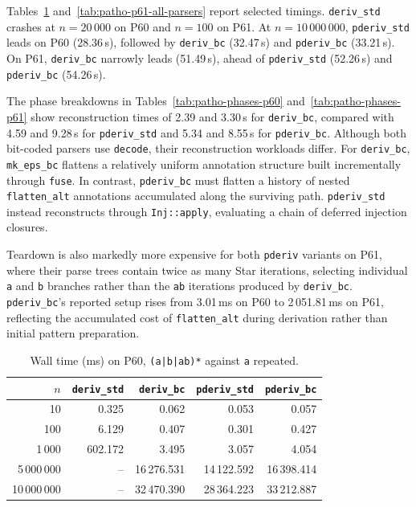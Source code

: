 %
%
%


Tables~\ref{tab:patho-p60-all-parsers}
and~\ref{tab:patho-p61-all-parsers}
report selected timings.
\texttt{deriv\_std} crashes at $n=20\,000$
on P60 and $n=100$ on P61.
At $n=10\,000\,000$, \texttt{pderiv\_std}
leads on P60 (28.36\,s), followed by
\texttt{deriv\_bc} (32.47\,s) and
\texttt{pderiv\_bc} (33.21\,s).
On P61, \texttt{deriv\_bc} narrowly leads
(51.49\,s), ahead of \texttt{pderiv\_std}
(52.26\,s) and \texttt{pderiv\_bc} (54.26\,s).

The phase breakdowns in
Tables~\ref{tab:patho-phases-p60}
and~\ref{tab:patho-phases-p61}
show reconstruction times of 2.39 and 3.30\,s
for \texttt{deriv\_bc}, compared with
4.59 and 9.28\,s for \texttt{pderiv\_std}
and 5.34 and 8.55\,s for \texttt{pderiv\_bc}.
Although both bit-coded parsers use \texttt{decode},
their reconstruction workloads differ.
For \texttt{deriv\_bc}, \texttt{mk\_eps\_bc}
flattens a relatively uniform annotation structure
built incrementally through \texttt{fuse}.
In contrast, \texttt{pderiv\_bc} must flatten
a history of nested \texttt{flatten\_alt}
annotations accumulated along the surviving path.
\texttt{pderiv\_std} instead reconstructs
through \texttt{Inj::apply}, evaluating a chain
of deferred injection closures.

Teardown is also markedly more expensive for
both \texttt{pderiv} variants on P61, where
their parse trees contain twice as many
Star iterations, selecting individual
\texttt{a} and \texttt{b} branches rather than
the \texttt{ab} iterations produced by
\texttt{deriv\_bc}.
\texttt{pderiv\_bc}'s reported setup
rises from 3.01\,ms on P60 to 2\,051.81\,ms
on P61, reflecting the accumulated cost of
\texttt{flatten\_alt} during derivation
rather than initial pattern preparation.


%

\begin{table}[H]
\centering
\small
\setlength{\tabcolsep}{4pt}
\begin{tabular*}{\textwidth}{@{\extracolsep{\fill}} r rrrr}
\hline
$n$ & \texttt{deriv\_std} & \texttt{deriv\_bc} & \texttt{pderiv\_std} & \texttt{pderiv\_bc} \\
\hline
10             &        0.325 &      0.062 &      0.053 &      0.057 \\
100            &        6.129 &      0.407 &      0.301 &      0.427 \\
1\,000         &      602.172 &      3.495 &      3.057 &      4.054 \\
5\,000\,000    &           -- & 16\,276.531 & 14\,122.592 & 16\,398.414 \\
10\,000\,000   &           -- & 32\,470.390 & 28\,364.223 & 33\,212.887 \\
\hline
\end{tabular*}
\caption{Wall time (ms) on P60, \texttt{(a|b|ab)*} against \texttt{a}
repeated.}
\label{tab:patho-p60-all-parsers}
\end{table}

